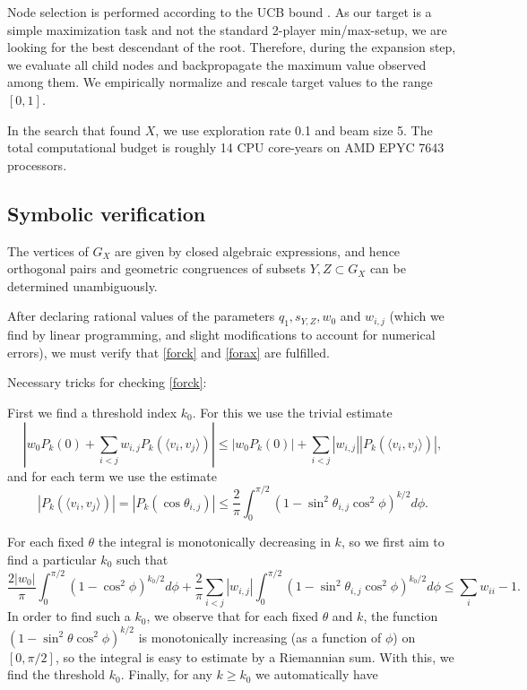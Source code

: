 \documentclass[11pt]{amsart}
\numberwithin{equation}{section}
\begin{document}
Node selection is performed according to the UCB bound \cite{kocsisszepesvari}.
As our target is a simple maximization task and not the standard 2-player min/max-setup, we are looking for the best descendant of the root.
Therefore, during the expansion step, we evaluate all child nodes and backpropagate the maximum value observed among them.
We empirically normalize and rescale target values to the range $[0,1]$.

In the search that found $X$, we use exploration rate 0.1 and beam size 5. The total computational budget is roughly 14 CPU core-years on AMD EPYC 7643 processors.

\subsection{Symbolic verification}

The vertices of $G_X$ are given by closed algebraic expressions, and hence orthogonal pairs and geometric congruences of subsets $Y, Z\subset G_X$ can be determined unambiguously. 

\medskip

After declaring rational values of the parameters $q_1, s_{Y,Z}, w_0$ and $w_{i,j}$ (which we find by linear programming, and slight modifications to account for numerical errors), we must verify that \eqref{forck} and \eqref{forax} are fulfilled. 

\medskip

Necessary tricks for checking \eqref{forck}: 

\medskip

First we find a threshold index $k_0$. For this we use the trivial estimate 
$$|w_0P_k(0)+\sum_{i < j}w_{i,j}P_k(\langle v_i, v_j \rangle )|\le |w_0P_k(0)|+\sum_{i < j}|w_{i,j}| | P_k(\langle v_i, v_j \rangle )|,$$
and for each term we use the estimate 
$$|P_k(\langle v_i, v_j \rangle )|=|P_k(\cos \theta_{i,j} )|\le \frac{2}{\pi}\int_0^{\pi/2} (1-\sin^2 \theta_{i,j} \cos^2 \phi )^{k/2}d\phi.$$

For each fixed $\theta$ the integral is monotonically decreasing in $k$, so we first aim to find a particular $k_0$ such that 
\begin{equation}\label{k0}
\frac{2|w_0|}{\pi} \int_0^{\pi/2} (1-\cos^2 \phi )^{k_0/2}d\phi+
\frac{2}{\pi}\sum_{i< j}|w_{i,j}| \int_0^{\pi/2} (1-\sin^2 \theta_{i,j} \cos^2 \phi )^{k_0/2}d\phi\le \sum_i w_{ii}-1.
\end{equation}
In order to find such a $k_0$, we observe that for each fixed $\theta$ and $k$, the function $(1-\sin^2 \theta \cos^2 \phi )^{k/2}$ is monotonically increasing (as a function of $\phi$) on $[0, \pi/2]$, so the integral is easy to estimate by a Riemannian sum.  With this, we find the threshold $k_0$. Finally, for any $k\ge k_0$ we automatically have 
\end{document}
